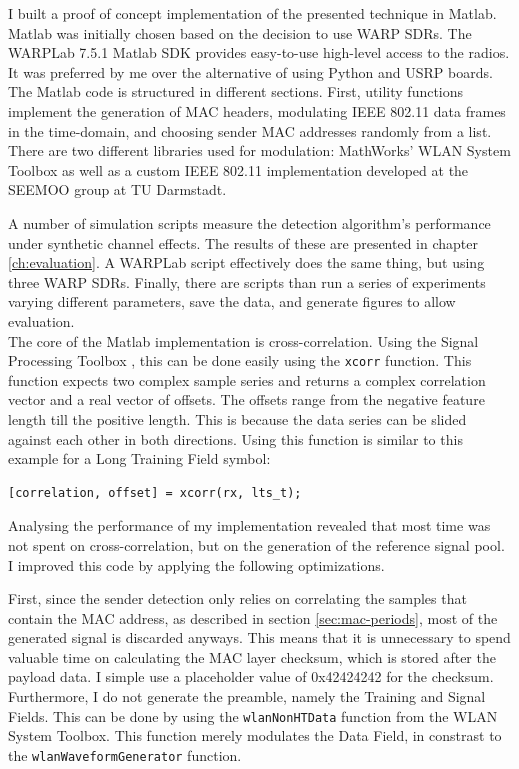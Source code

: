 I built a proof of concept implementation of the presented technique in Matlab. Matlab was initially chosen based on the decision to use \gls{WARP} \glspl{SDR}. The WARPLab 7.5.1 Matlab \gls{SDK} \cite{warplab} provides easy-to-use high-level access to the radios. It was preferred by me over the alternative of using Python and \gls{USRP} boards.\\

The Matlab code is structured in different sections. First, utility functions implement the generation of MAC headers, modulating IEEE 802.11 data frames in the time-domain, and choosing sender MAC addresses randomly from a list. There are two different libraries used for modulation: MathWorks' WLAN System Toolbox \cite{wlantoolbox} as well as a custom IEEE 802.11 implementation developed at the \gls{SEEMOO} group at TU Darmstadt.

A number of simulation scripts measure the detection algorithm's performance under synthetic channel effects. The results of these are presented in chapter \ref{ch:evaluation}. A WARPLab script effectively does the same thing, but using three \gls{WARP} \glspl{SDR}. Finally, there are scripts than run a series of experiments varying different parameters, save the data, and generate figures to allow evaluation.\\

The core of the Matlab implementation is cross-correlation. Using the Signal Processing Toolbox \cite{signaltoolbox}, this can be done easily using the \texttt{xcorr} function. This function expects two complex sample series and returns a complex correlation vector and a real vector of offsets. The offsets range from the negative feature length till the positive length. This is because the data series can be slided against each other in both directions. Using this function is similar to this example for a Long Training Field symbol:\\

\begin{lstlisting}[captionpos=b,caption={Cross-Correlation of LTF symbol},label=lst:xcorr]
[correlation, offset] = xcorr(rx, lts_t);
\end{lstlisting}

Analysing the performance of my implementation revealed that most time was not spent on cross-correlation, but on the generation of the reference signal pool. I improved this code by applying the following optimizations.

First, since the sender detection only relies on correlating the samples that contain the MAC address, as described in section \ref{sec:mac-periods}, most of the generated signal is discarded anyways. This means that it is unnecessary to spend valuable time on calculating the MAC layer checksum, which is stored after the payload data. I simple use a placeholder value of 0x42424242 for the checksum. Furthermore, I do not generate the preamble, namely the Training and Signal Fields. This can be done by using the \texttt{wlanNonHTData} function from the WLAN System Toolbox. This function merely modulates the Data Field, in constrast to the \texttt{wlanWaveformGenerator} function.

